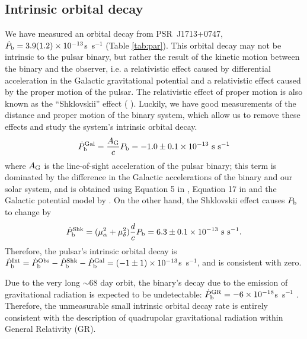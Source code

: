\subsection{Intrinsic orbital decay}
\label{sec:obdecay}
We have measured an orbital decay from PSR~J1713+0747, $\dot{P}_{\rm b} =
3.9(1.2)\times10^{-13}$s~s$^{-1}$ (Table \ref{tab:par}).
This orbital decay may not be intrinsic to the pulsar binary, but rather the
result of the kinetic motion between the binary and the
observer, i.e. a relativistic effect caused by differential 
acceleration in the Galactic gravitational potential
\citep{dt91} and a relativistic effect caused by the proper motion of the
pulsar. The relativistic effect
of proper motion is also known as the ``Shklovskii'' effect (
\citealt{shk70}). Luckily, we have good measurements of the distance and proper
motion of the binary system, which allow us to remove these effects and study the system's intrinsic orbital decay.
\begin{equation}
\dot{P}_{\rm b}^{\rm Gal} = \frac{A_{\rm G}}{c} P_{\rm b} =
-1.0\pm0.1\times10^{-13}~{\rm s~s^{-1}}
\end{equation}
where $A_{\rm G}$ is the line-of-sight acceleration of the pulsar binary;
this term is dominated by the difference in the Galactic accelerations of the
binary and our solar system, and is obtained using
Equation 5 in \citet{nt95}, Equation 17 in \citet{lwj+09} and the Galactic
potential model by \citet{hf04a}.
On the other hand, the Shklovskii effect causes $P_{\rm b}$ to
change by
\begin{equation}
\dot{P}_{\rm b}^{\rm Shk} = (\mu_{\alpha}^2+\mu_{\delta}^2)\frac{d}{c}P_{\rm
b} = 6.3\pm0.1\times10^{-13}~{\rm s~s^{-1}}.
\end{equation}
Therefore, the pulsar's intrinsic orbital decay is $\dot{P}_{\rm b}^{\rm Int}
= \dot{P}_{\rm b}^{\rm Obs} - \dot{P}_{\rm b}^{\rm Shk} - \dot{P}_{\rm b}^{\rm
Gal} = (-1\pm1)\times10^{-13}$s~s$^{-1}$, and is consistent with zero.

Due to the very long $\sim$68 day orbit, the binary's decay due to the
emission of gravitational
radiation is expected to be undetectable: $\dot{P}_{\rm b}^{\rm GR} =
-6\times10^{-18}$s~s$^{-1}$ \citep{lk05}.  Therefore, the unmeasurable small 
intrinsic orbital decay rate is entirely consistent with the
description of quadrupolar gravitational radiation within General
Relativity (GR).


